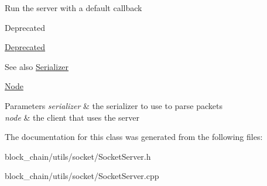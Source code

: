 Run the server with a default callback \begin{DoxyRefDesc}{Deprecated}
\item[\mbox{\hyperlink{deprecated__deprecated000001}{Deprecated}}]\end{DoxyRefDesc}
\begin{DoxySeeAlso}{See also}
\mbox{\hyperlink{classSerializer}{Serializer}} 

\mbox{\hyperlink{classNode}{Node}}
\end{DoxySeeAlso}

\begin{DoxyParams}{Parameters}
{\em serializer} & the serializer to use to parse packets \\
\hline
{\em node} & the client that uses the server \\
\hline
\end{DoxyParams}


The documentation for this class was generated from the following files\+:\begin{DoxyCompactItemize}
\item 
block\+\_\+chain/utils/socket/Socket\+Server.\+h\item 
block\+\_\+chain/utils/socket/Socket\+Server.\+cpp\end{DoxyCompactItemize}
